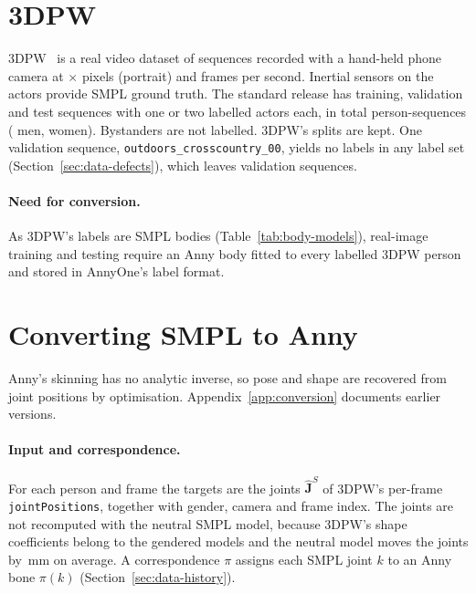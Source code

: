 \section{3DPW}
\label{sec:data-3dpw}

3DPW~\cite{vonmarcard2018_3dpw} is a real video dataset of \DataThreeDPWSequences{} sequences recorded with a hand-held
phone camera at \DataThreeDPWWidth{}$\times$\DataThreeDPWHeight{} pixels (portrait) and \DataThreeDPWFps{} frames per
second. Inertial sensors on the actors provide SMPL ground truth. The standard release has \DataThreeDPWTrainSeq{}
training, \DataThreeDPWValSeq{} validation and \DataThreeDPWTestSeq{} test sequences with one or two labelled actors
each, in total \DataThreeDPWPersonSeq{} person-sequences (\DataThreeDPWMen{} men, \DataThreeDPWWomen{} women).
Bystanders are not labelled. 3DPW's splits are kept. One validation sequence,
\texttt{outdoors\_crosscountry\_00}, yields no labels in any label set (Section~\ref{sec:data-defects}), which leaves
\DataThreeDPWValUsableSeq{} validation sequences.

\paragraph{Need for conversion.} As 3DPW's labels are SMPL bodies (Table~\ref{tab:body-models}), real-image
training and testing require an Anny body fitted to every labelled 3DPW person and stored in AnnyOne's label format.

\section{Converting SMPL to Anny}
\label{sec:data-converter}

Anny's skinning has no analytic inverse, so pose and shape are recovered from joint positions by optimisation.
Appendix~\ref{app:conversion} documents earlier versions.

\paragraph{Input and correspondence.} For each person and frame the targets are the \DataSmplJoints{} joints
$\hat{\mathbf{J}}^{S}$ of 3DPW's per-frame \texttt{jointPositions}, together with gender, camera and frame index. The
joints are not recomputed with the neutral SMPL model, because 3DPW's shape coefficients belong to the gendered
models and the neutral model moves the joints by \DataNeutralShift\,mm on average. A correspondence $\pi$ assigns
each SMPL joint $k$ to an Anny bone $\pi(k)$ (Section~\ref{sec:data-history}).

